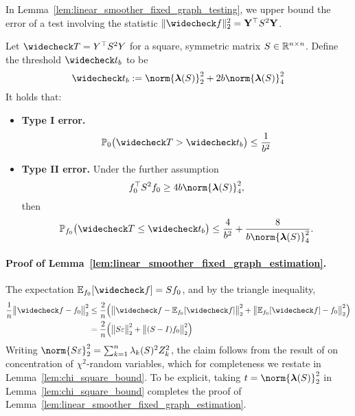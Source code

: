 In Lemma~\ref{lem:linear_smoother_fixed_graph_testing}, we upper bound the error of a test involving the statistic $\|\wc{f}\|_2^2 = {\bf Y}^{\top} S^2 {\bf Y}$.
\begin{lemma}
	\label{lem:linear_smoother_fixed_graph_testing}
	Let $\wc{T} = Y^{\top} S^2 Y$ for a square, symmetric matrix $S \in \mathbb{R}^{n \times n}$. Define the threshold $\wc{t}_b$ to be 
	\begin{equation}
	\wc{t}_{b} := \norm{\lambdavec(S)}_2^2 + 2b \norm{\lambdavec(S)}_4^2
	\end{equation}
	It holds that:
	\begin{itemize}
		\item \textbf{Type I error.}
		\begin{equation}
		\label{eqn:linear_smoother_fixed_graph_testing_typeI}
		\Pbb_0\bigl(\wc{T} > \wc{t}_b\bigr) \leq \frac{1}{b^2}
		\end{equation}
		\item \textbf{Type II error.} Under the further assumption
		\begin{equation}
		\label{eqn:linear_smoother_fixed_graph_testing_critical_radius}
		f_0^{\top} S^2 f_0 \geq 4b \norm{\lambdavec(S)}_4^2,
		\end{equation}
		then
		\begin{equation}
		\label{eqn:linear_smoother_fixed_graph_testing_typeII}
		\Pbb_{f_0}\bigl(\wc{T} \leq \wc{t}_b\bigr) \leq \frac{4}{b^2} + \frac{8}{b \norm{\lambdavec(S)}_4^{2}}.
		\end{equation}
	\end{itemize}
\end{lemma}

\paragraph{Proof of Lemma~\ref{lem:linear_smoother_fixed_graph_estimation}.}
The expectation $\Ebb_{f_0}[\wc{f}] = Sf_0$, and by the triangle inequality,
\begin{align*}
\frac{1}{n}\bigl\|\wc{f} - f_0\bigr\|_2^2 & \leq \frac{2}{n}\Bigl(\bigl\|\wc{f} - \Ebb_{f_0}[\wc{f}]\bigr\|_2^2 + \bigl\|\Ebb_{f_0}[\wc{f}] - f_0\bigr\|_2^2\Bigr) \\ 
& = \frac{2}{n}\Bigl(\bigl\|S\varepsilon\bigr\|_2^2 + \bigl\|(S - I)f_0\bigr\|_2^2\Bigr)
\end{align*}
Writing $\norm{S\varepsilon}_2^2 = \sum_{k = 1}^{n} \lambda_k(S)^2 Z_k^2$, the claim follows from the result of \citet{laurent00} on concentration of $\chi^2$-random variables, which for completeness we restate in Lemma~\ref{lem:chi_square_bound}. To be explicit, taking $t = \norm{\lambdavec(S)}_2^2$ in Lemma~\ref{lem:chi_square_bound} completes the proof of Lemma~\ref{lem:linear_smoother_fixed_graph_estimation}. 


